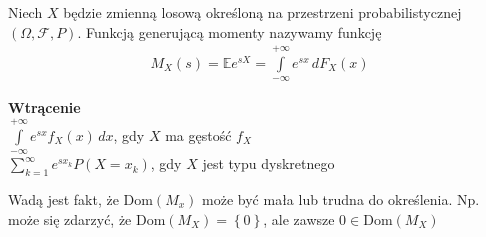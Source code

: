 \begin{defi}
Niech $ X $ będzie zmienną losową określoną na przestrzeni probabilistycznej $(\Omega,\mathcal F,P)$. Funkcją generującą momenty nazywamy funkcję
\begin{gather*}
M_X(s)=\mathbb E e^{sX}=\int\limits_{-\infty }^{+\infty }e^{sx}\,dF_X(x)
\end{gather*} 
\begin{center}
	{\small \textbf{Wtrącenie}\\
	$ \int\limits_{-\infty }^{+\infty }e^{sx}f_X(x)\,dx $, gdy $ X $ ma gęstość $ f_X$ \\
	$\sum_{k=1}^{\infty }e^{sx_k}P\left(X=x_k\right) $, gdy $ X $ jest typu dyskretnego
	}
\end{center}
\end{defi}
Wadą jest fakt, że Dom$ \left(M_x\right) $ może być mała lub trudna do określenia. Np. może się zdarzyć, że Dom$ \left(M_X\right)=\left\{0\right\} $, ale zawsze $ 0\in\text{Dom}\left(M_X\right) $

